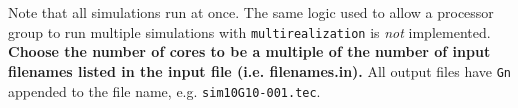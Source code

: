{\noindent  
Note that all simulations run at once. The same logic used to allow a processor group to run multiple simulations with \texttt{multirealization} is {\em not} implemented. \textbf{Choose the number of cores to be a multiple of the number of input filenames listed in the input file (i.e. filenames.in).} All output files have \texttt{Gn} appended to the file name, e.g. \texttt{sim10G10-001.tec}.

}
